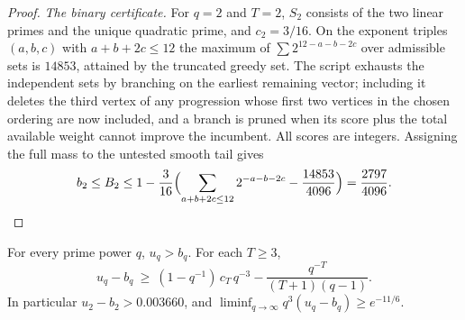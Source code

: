 \begin{proof}
\emph{The binary certificate.} For $q=2$ and $T=2$, $S_2$ consists of the two linear primes
and the unique quadratic prime, and $c_2=3/16$. On the exponent triples $(a,b,c)$ with
$a+b+2c\le12$ the maximum of $\sum2^{12-a-b-2c}$ over admissible sets is $14853$, attained by
the truncated greedy set. The script
exhausts the independent sets by branching on the earliest remaining vector; including it
deletes the third vertex of any progression whose first two vertices in the chosen ordering
are now included, and a branch is pruned when its score plus the total available weight
cannot improve the incumbent. All scores are integers. Assigning the full mass to the
untested smooth tail gives
\[
 b_2\le B_2\le1-\frac3{16}\Bigl(\sum_{a+b+2c\le12}2^{-a-b-2c}-\frac{14853}{4096}\Bigr)
 =\frac{2797}{4096}. \qedhere
\]
\end{proof}

\begin{theorem}\label{gpi:thm:poly-gap}
For every prime power $q$, $u_q>b_q$. For each $T\ge3$,
\[
 u_q-b_q\ \ge\ (1-q^{-1})\,c_T\,q^{-3}-\frac{q^{-T}}{(T+1)(q-1)} .
\]
In particular $u_2-b_2>0.003660$, and $\liminf_{q\to\infty}q^3(u_q-b_q)\ge e^{-11/6}$.
\end{theorem}

